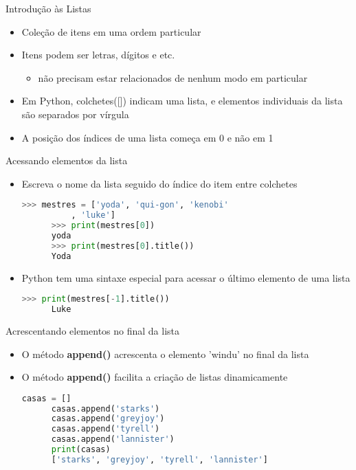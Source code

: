 
\begin{frame}[t, fragile]{Introdução às Listas}
  \begin{itemize}
    \item Coleção de itens em uma ordem particular
    \item Itens podem ser letras, dígitos e etc.
    \begin{itemize}
      \item não precisam estar relacionados de nenhum modo em particular
    \end{itemize}
    \item Em Python, colchetes([]) indicam uma lista, e elementos individuais da
      lista são separados por vírgula
    \item A posição dos índices de uma lista começa em 0 e não em 1
  \end{itemize}
\end{frame}
%
\begin{frame}{Acessando elementos da lista}
  \begin{itemize}
    \item Escreva o nome da lista seguido do índice do item entre colchetes
  
    \begin{lstlisting}[language=python]
      >>> mestres = ['yoda', 'qui-gon', 'kenobi'
          , 'luke']
      >>> print(mestres[0])
      yoda
      >>> print(mestres[0].title())
      Yoda
    \end{lstlisting}
    \item Python tem uma sintaxe especial para acessar o último elemento de uma lista
    \begin{lstlisting}[language=python]
      >>> print(mestres[-1].title())
      Luke
    \end{lstlisting}
  \end{itemize}
\end{frame}
%
\begin{frame}{Acrescentando elementos no final da lista}
  \begin{itemize}
    \begin{lstlisting}[language=python]
      >>> mestres = ['yoda', 'qui-gon', 'kenobi'
          , 'luke']
      >>> mestres.append('windu')
      >>> print(mestres)
      ['yoda', 'qui-gon', 'kenobi', 'luke', 'windu']
    \end{lstlisting}
    \item O método {\bf append()} acrescenta o elemento 'windu' no final da lista 
    \pagebreak
    \item O método {\bf append()} facilita a criação de listas dinamicamente
    \begin{lstlisting}[language=python]
      casas = []
      casas.append('starks')
      casas.append('greyjoy')
      casas.append('tyrell')
      casas.append('lannister')
      print(casas)
      ['starks', 'greyjoy', 'tyrell', 'lannister']
    \end{lstlisting}
  \end{itemize}
\end{frame}
